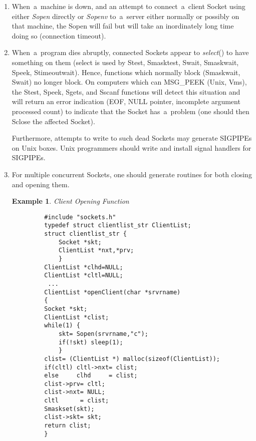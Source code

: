 \documentclass[12pt]{article}
\newtheorem{example}{Example}[section]
\begin{document}
\begin{enumerate}
  \item When~a~machine is down, and an attempt to connect~a~client Socket using
    either {\em Sopen\/} directly or {\em Sopenv\/} to~a~server either normally
    or possibly on that machine, the Sopen will fail but will take an inordinately
    long time doing so (connection timeout).

 \item When~a~program dies abruptly, connected Sockets appear to {\em select}()
   to have something on them (select is used by Stest, Smasktest, Swait,
   Smaskwait, Speek, Stimeoutwait).  Hence, functions which normally block
   (Smaskwait, Swait) no longer block.  On computers which can {\small
   MSG\_PEEK} (Unix, Vms), the Stest, Speek, Sgets, and Sscanf functions will
   detect this situation and will return an error indication ({\small EOF},
   {\small NULL} pointer, incomplete argument processed count) to indicate that
   the Socket has~a~problem (one should then Sclose the affected Socket).

   Furthermore, attempts to write to such dead Sockets may generate
   {\small SIGPIPE}s on Unix boxes.  Unix programmers should write and install
   signal handlers for {\small SIGPIPE}s.

  \item For multiple concurrent Sockets, one should generate routines for both
   closing and opening them.

    \begin{example} Client Opening Function              \\ \label{client-opening}
     \begin{verbatim}
         #include "sockets.h"
         typedef struct clientlist_str ClientList;
         struct clientlist_str {
             Socket *skt;
             ClientList *nxt,*prv;
             }
         ClientList *clhd=NULL;
         ClientList *cltl=NULL;
          ...
         ClientList *openClient(char *srvrname)
         {
         Socket *skt;
         ClientList *clist;
         while(1) {
             skt= Sopen(srvrname,"c");
             if(!skt) sleep(1);
             }
         clist= (ClientList *) malloc(sizeof(ClientList));
         if(cltl) cltl->nxt= clist;
         else     clhd     = clist;
         clist->prv= cltl;
         clist->nxt= NULL;
         cltl      = clist;
         Smaskset(skt);
         clist->skt= skt;
         return clist;
         }
     \end{verbatim}
    \end{example}


\end{enumerate}
\end{document}
